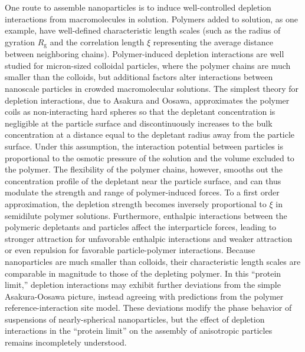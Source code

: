 \documentclass[journal=jacsat, superscriptaddress]{achemso}
\begin{document}
One route to assemble nanoparticles is to induce well-controlled depletion interactions from macromolecules in solution. Polymers added to solution, as one example, have well-defined characteristic length scales (such as the radius of gyration $R_\mathrm{g}$ and the correlation length $\xi$ representing the average distance between neighboring chains). Polymer-induced depletion interactions are well studied for micron-sized colloidal particles,\cite{Lekkerkerker2011} where the polymer chains are much smaller than the colloids, but additional factors alter interactions between nanoscale particles in crowded macromolecular solutions. The simplest theory for depletion interactions, due to Asakura and Oosawa,\cite{Asakura1958} approximates the polymer coils as non-interacting hard spheres so that the depletant concentration is negligible at the particle surface and discontinuously increases to the bulk concentration at a distance equal to the depletant radius away from the particle surface. Under this assumption, the interaction potential between particles is proportional to the osmotic pressure of the solution and the volume excluded to the polymer. The flexibility of the polymer chains, however, smooths out the concentration profile of the depletant near the particle surface, and can thus modulate the strength and range of polymer-induced forces.\cite{Kleshchanok2008} To a first order approximation, the depletion strength becomes inversely proportional to $\xi$ in semidilute polymer solutions.\cite{DeGennes1979} Furthermore, enthalpic interactions between the polymeric depletants and particles affect the interparticle forces, leading to stronger attraction for unfavorable enthalpic interactions and weaker attraction or even repulsion for favorable particle-polymer interactions.\cite{Semenov2015} Because nanoparticles are much smaller than colloids, their characteristic length scales are comparable in magnitude to those of the depleting polymer. In this ``protein limit,''\cite{Mutch2007} depletion interactions may exhibit further deviations from the simple Asakura-Oosawa picture,\cite{Kulkarni1999,Vivares2002} instead agreeing with predictions from the polymer reference-interaction site model.\cite{Chatterjee1998} These deviations modify the phase behavior of suspensions of nearly-spherical nanoparticles,\cite{Wormutht1991,Clegg1994,Piculell1996,Tuinier2000,Ramakrishnan2002a,Ramakrishnan2002b,Vliegenthart2003,Hennequin2005} but the effect of depletion interactions in the ``protein limit'' on the assembly of anisotropic particles remains incompletely understood.
\end{document}
